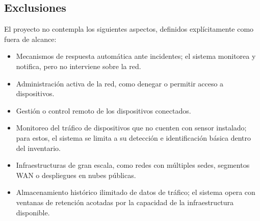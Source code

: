 \subsection{Exclusiones}

El proyecto no contempla los siguientes aspectos, definidos 
explícitamente como fuera de alcance:

\begin{itemize}
    \item Mecanismos de respuesta automática ante incidentes; el 
    sistema monitorea y notifica, pero no interviene sobre la red.

    \item Administración activa de la red, como denegar o permitir 
    acceso a dispositivos.

    \item Gestión o control remoto de los dispositivos conectados.

    \item Monitoreo del tráfico de dispositivos que no cuenten con 
    sensor instalado; para estos, el sistema se limita a su detección 
    e identificación básica dentro del inventario.

    \item Infraestructuras de gran escala, como redes con múltiples 
    sedes, segmentos WAN o despliegues en nubes públicas.

    \item Almacenamiento histórico ilimitado de datos de tráfico; el 
    sistema opera con ventanas de retención acotadas por la capacidad 
    de la infraestructura disponible.
\end{itemize}